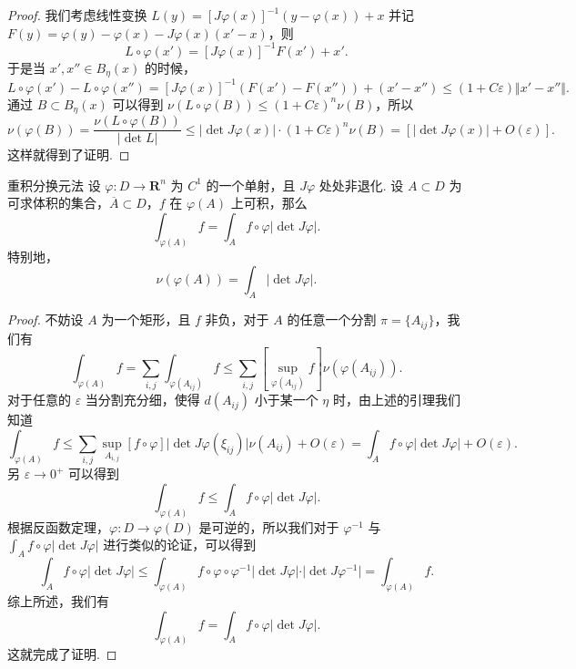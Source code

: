 \begin{proof}
    我们考虑线性变换 $L(y) = \left[J\varphi(x)\right]^{-1}(y - \varphi(x)) + x$ 并记 $F(y) = \varphi(y) - \varphi(x) - J\varphi(x)(x'-x)$，则 \[L\circ\varphi(x') = \left[J\varphi(x)\right]^{-1} F(x') + x'.\]
    于是当 $x', x''\in B_\eta(x)$ 的时候，\[L\circ\varphi(x') - L\circ\varphi(x'') = \left[J\varphi(x)\right]^{-1} (F(x') - F(x'')) + (x' - x'')\leqslant (1 + C\varepsilon)\Vert x' - x''\Vert.\]
    通过 $B\subset B_\eta(x)$ 可以得到 $\nu(L\circ\varphi(B)) \leqslant (1 + C\varepsilon)^n\nu(B)$，所以\[\nu(\varphi(B)) = \frac{\nu(L\circ\varphi(B))}{\vert \det L\vert}\leqslant \vert \det J\varphi(x)\vert \cdot (1 + C\varepsilon)^n\nu(B) = \left[\vert \det J\varphi(x)\vert + O(\varepsilon)\right].\]
    这样就得到了证明.
\end{proof}

\begin{theorem}{重积分换元法}{}
    设 $\varphi: D\to \mathbf{R}^n$ 为 $C^1$ 的一个单射，且 $J\varphi$ 处处非退化. 设 $A\subset D$ 为可求体积的集合，$\overline{A}\subset D$，$f$ 在 $\varphi(A)$ 上可积，那么\[\int_{\varphi(A)}f = \int_A f\circ \varphi\vert \det J\varphi\vert.\]
    特别地，\[\nu(\varphi(A)) = \int_A \vert \det J\varphi\vert.\]
\end{theorem}

\begin{proof}
    不妨设 $A$ 为一个矩形，且 $f$ 非负，对于 $A$ 的任意一个分割 $\pi = \{A_{ij}\}$，我们有\[\int_{\varphi(A)}f = \sum_{i, j}\int_{\varphi(A_{ij})}f \leqslant \sum_{i, j}[\sup\limits_{\varphi(A_{ij})}f]\nu(\varphi(A_{ij})).\]
    对于任意的 $\varepsilon$ 当分割充分细，使得 $d(A_{ij})$ 小于某一个 $\eta$ 时，由上述的引理我们知道\[\int_{\varphi(A)}f \leqslant \sum_{i, j}\sup\limits_{A_{i, j}}[f\circ\varphi] \vert\det J\varphi(\xi_{ij})\vert \nu(A_{ij}) + O(\varepsilon) = \int_{A}f\circ\varphi\vert\det J\varphi\vert + O(\varepsilon).\]
    另 $\varepsilon\to0^+$ 可以得到\[\int_{\varphi(A)}f\leqslant \int_A f\circ\varphi\vert\det J\varphi\vert.\]
    根据反函数定理，$\varphi:D\to \varphi(D)$ 是可逆的，所以我们对于 $\varphi^{-1}$ 与 $\displaystyle\int_{A}f\circ\varphi\vert\det J\varphi\vert$ 进行类似的论证，可以得到 \[\int_{A}f \circ \varphi\vert \det J\varphi\vert \leqslant \int_{\varphi(A)}f\circ \varphi\circ\varphi^{-1}\vert\det J\varphi\vert \cdot\vert \det J\varphi^{-1}\vert  = \int_{\varphi(A)}f.\]
    综上所述，我们有\[\int_{\varphi(A)}f = \int_{A}f\circ\varphi\vert\det J\varphi\vert.\]这就完成了证明.
\end{proof}

